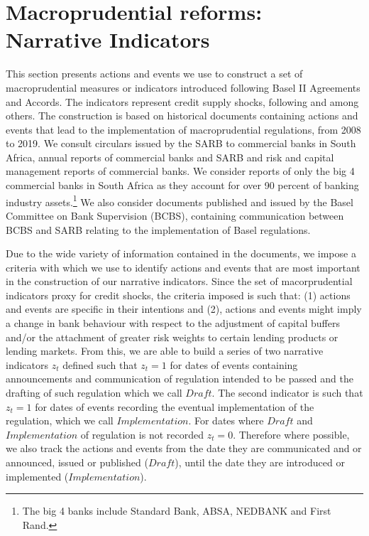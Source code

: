 \documentclass[
  letterpaper,
  DIV=11,
  numbers=noendperiod]{scrartcl}
\begin{document}
\hypertarget{macroprudential-reforms-narrative-indicators}{%
\section{Macroprudential reforms: Narrative
Indicators}\label{macroprudential-reforms-narrative-indicators}}

This section presents actions and events we use to construct a set of
macroprudential measures or indicators introduced following Basel II
Agreements and Accords. The indicators represent credit supply shocks,
following \cite{noss2016estimating} and \cite{deli2017real} among
others. The construction is based on historical documents containing
actions and events that lead to the implementation of macroprudential
regulations, from 2008 to 2019. We consult circulars issued by the SARB
to commercial banks in South Africa, annual reports of commercial banks
and SARB and risk and capital management reports of commercial banks. We
consider reports of only the big 4 commercial banks in South Africa as
they account for over 90 percent of banking industry
assets.\footnote{The big 4 banks include Standard Bank, ABSA, NEDBANK and First Rand.}
We also consider documents published and issued by the Basel Committee
on Bank Supervision (BCBS), containing communication between BCBS and
SARB relating to the implementation of Basel regulations.

Due to the wide variety of information contained in the documents, we
impose a criteria with which we use to identify actions and events that
are most important in the construction of our narrative indicators.
Since the set of macorprudential indicators proxy for credit shocks, the
criteria imposed is such that: (1) actions and events are specific in
their intentions and (2), actions and events might imply a change in
bank behaviour with respect to the adjustment of capital buffers and/or
the attachment of greater risk weights to certain lending products or
lending markets. From this, we are able to build a series of two
narrative indicators \(z_{t}\) defined such that \(z_{t}=1\) for dates
of events containing announcements and communication of regulation
intended to be passed and the drafting of such regulation which we call
\(Draft\). The second indicator is such that \(z_{t}=1\) for dates of
events recording the eventual implementation of the regulation, which we
call \(Implementation\). For dates where \(Draft\) and
\(Implementation\) of regulation is not recorded \(z_{t}=0\). Therefore
where possible, we also track the actions and events from the date they
are communicated and or announced, issued or published (\(Draft\)),
until the date they are introduced or implemented (\(Implementation\)).
\end{document}
